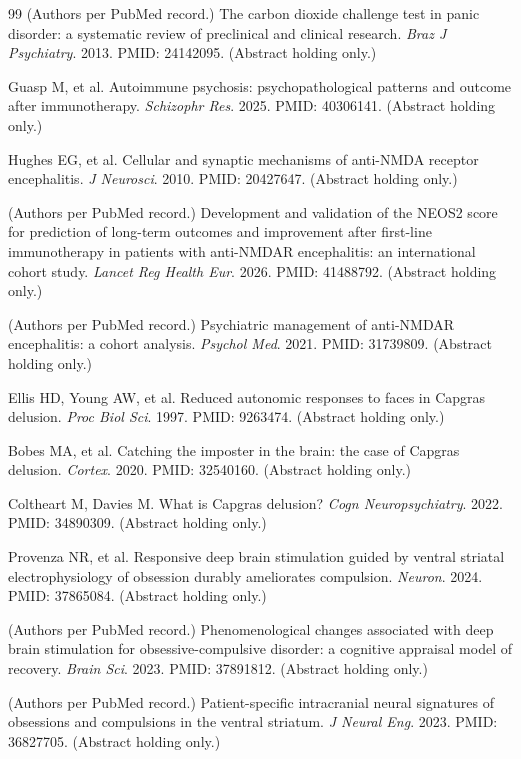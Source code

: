 \documentclass[9pt,twocolumn]{article}
\begin{document}
\begin{thebibliography}{99}
(Authors per PubMed record.) The carbon dioxide challenge test in panic disorder: a systematic review of preclinical and clinical research. \emph{Braz J Psychiatry}. 2013. PMID: 24142095. (Abstract holding only.)

Guasp M, et al. Autoimmune psychosis: psychopathological patterns and outcome after immunotherapy. \emph{Schizophr Res}. 2025. PMID: 40306141. (Abstract holding only.)

Hughes EG, et al. Cellular and synaptic mechanisms of anti-NMDA receptor encephalitis. \emph{J Neurosci}. 2010. PMID: 20427647. (Abstract holding only.)

(Authors per PubMed record.) Development and validation of the NEOS2 score for prediction of long-term outcomes and improvement after first-line immunotherapy in patients with anti-NMDAR encephalitis: an international cohort study. \emph{Lancet Reg Health Eur}. 2026. PMID: 41488792. (Abstract holding only.)

(Authors per PubMed record.) Psychiatric management of anti-NMDAR encephalitis: a cohort analysis. \emph{Psychol Med}. 2021. PMID: 31739809. (Abstract holding only.)

Ellis HD, Young AW, et al. Reduced autonomic responses to faces in Capgras delusion. \emph{Proc Biol Sci}. 1997. PMID: 9263474. (Abstract holding only.)

Bobes MA, et al. Catching the imposter in the brain: the case of Capgras delusion. \emph{Cortex}. 2020. PMID: 32540160. (Abstract holding only.)

Coltheart M, Davies M. What is Capgras delusion? \emph{Cogn Neuropsychiatry}. 2022. PMID: 34890309. (Abstract holding only.)

Provenza NR, et al. Responsive deep brain stimulation guided by ventral striatal electrophysiology of obsession durably ameliorates compulsion. \emph{Neuron}. 2024. PMID: 37865084. (Abstract holding only.)

(Authors per PubMed record.) Phenomenological changes associated with deep brain stimulation for obsessive-compulsive disorder: a cognitive appraisal model of recovery. \emph{Brain Sci}. 2023. PMID: 37891812. (Abstract holding only.)

(Authors per PubMed record.) Patient-specific intracranial neural signatures of obsessions and compulsions in the ventral striatum. \emph{J Neural Eng}. 2023. PMID: 36827705. (Abstract holding only.)


\end{thebibliography}
\end{document}
